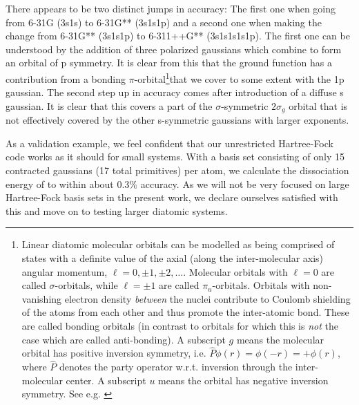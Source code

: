 \documentclass[../../master.tex]{subfiles}
\begin{document}
There appears to be two distinct jumps in accuracy: The first one when going from 6-31G (3s1s) to 6-31G** (3s1s1p) and a second one when making the change from 6-31G** (3s1s1p) to 6-311++G** (3s1s1s1s1p). The first one can be understood by the addition of three polarized gaussians which combine to form an orbital of p symmetry. It is clear from this that the  ground function has a contribution from a bonding $\pi$-orbital\footnote{Linear diatomic molecular orbitals can be modelled as being comprised of states with a definite value of the axial (along the inter-molecular axis) angular momentum, $\ell=0,\pm1,\pm2,\dots$. Molecular orbitals with $\ell=0$ are called $\sigma$-orbitals, while $\ell=\pm1$ are called $\pi_u$-orbitals. Orbitals with non-vanishing electron density \emph{between} the nuclei contribute to Coulomb shielding of the atoms from each other and thus promote the inter-atomic bond. These are called bonding orbitals (in contrast to orbitals for which this is \emph{not} the case which are called anti-bonding). A subscript $g$ means the molecular orbital has positive inversion symmetry, i.e. $\hat P \phi(r)=\phi(-r) = +\phi(r)$, where $\hat P$ denotes the party operator w.r.t. inversion through the inter-molecular center. A subscript $u$ means the orbital has negative inversion symmetry. See e.g. \cite{zumdahl}}that we cover to some extent with the 1p gaussian. The second step up in accuracy comes after introduction of a diffuse s gaussian. It is clear that this covers a part of the $\sigma$-symmetric $2\sigma_g$ orbital that is not effectively covered by the other s-symmetric gaussians with larger exponents. 

As a validation example, we feel confident that our unrestricted Hartree-Fock code works as it should for small systems. With a basis set consisting of only 15 contracted gaussians (17 total primitives) per atom, we calculate the dissociation energy of  to within about $0.3\%$ accuracy. As we will not be very focused on large Hartree-Fock basis sets in the present work, we declare ourselves satisfied with this and move on to testing larger diatomic systems.
\end{document}
